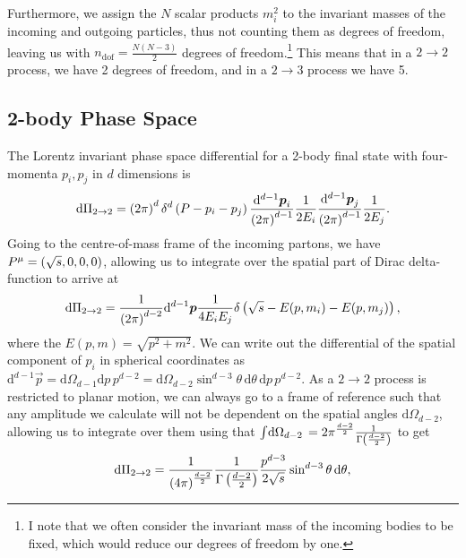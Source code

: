 \documentclass[../main.tex]{subfiles}
\begin{document}
        Furthermore, we assign the \(N\) scalar products \(m^2_i\) to the invariant masses of the incoming and outgoing particles, thus not counting them as degrees of freedom, leaving us with
        \(n_\text{dof} = \frac{N(N-3)}{2}\) degrees of freedom.\footnote{I note that we often consider the invariant mass of the incoming bodies to be fixed, which would reduce our degrees of freedom by one.}
        This means that in a \(2\to 2\) process, we have 2 degrees of freedom, and in a \(2\to 3\) process we have 5.


        \subsection{2-body Phase Space}
            The Lorentz invariant phase space differential for a 2-body final state with four-momenta \(p_i, p_j\) in \(d\) dimensions is
            \begin{equation}
                \mathrm{d}\Pi_{2\to 2} = \left(2\pi\right)^d \delta^d\left(P - p_i - p_j\right) \frac{\mathrm{d}^{d-1} \boldsymbol{p}_i}{\left(2\pi\right)^{d-1}} \frac{1}{2E_i} \frac{\mathrm{d}^{d-1} \boldsymbol{p}_j}{\left(2\pi\right)^{d-1}} \frac{1}{2E_j}.
            \end{equation}
            Going to the centre-of-mass frame of the incoming partons, we have \(P\^\mu = \pclosed{\sqrt{s}, 0, 0, 0}\), allowing us to integrate over the spatial part of Dirac delta-function to arrive at
            \begin{equation}
                \mathrm{d}\Pi_{2\to 2} = \frac{1}{\left(2\pi\right)^{d-2}} \mathrm{d}^{d-1} \boldsymbol{p} \frac{1}{4E_i E_j} \delta\left(\sqrt{s} - E(p, m_i) - E(p, m_j)\right),
            \end{equation}
            where the \(E(p, m) = \sqrt{p^2 + m^2}\).
            We can write out the differential of the spatial component of \(p_i\) in spherical coordinates as \(\mathrm{d}^{d-1} \vec{p} = \mathrm{d}\Omega_{d-1} \mathrm{d}p \, p^{d-2} = \mathrm{d}\Omega_{d-2} \sin^{d-3}\theta \, \mathrm{d}\theta \, \mathrm{d}p \, p^{d-2}\).
            As a \(2\to 2\) process is restricted to planar motion, we can always go to a frame of reference such that any amplitude we calculate will not be dependent on the spatial angles \(\mathrm{d} \Omega_{d-2}\), allowing us to integrate over them using that \(\int \!\mathrm{d}\Omega_{d-2}\, = 2 \pi^{\frac{d-2}{2}} \frac{1}{\Gamma\left(\frac{d-2}{2}\right)}\) to get
            \begin{equation}
                \mathrm{d}\Pi_{2\to 2} = \frac{1}{\left(4\pi\right)^{\frac{d-2}{2}}} \frac{1}{\Gamma\left(\frac{d-2}{2}\right)} \frac{p^{d-3}}{2 \sqrt{s}} \sin^{d-3}\theta \,\mathrm{d}\theta,
            \end{equation}
\end{document}
